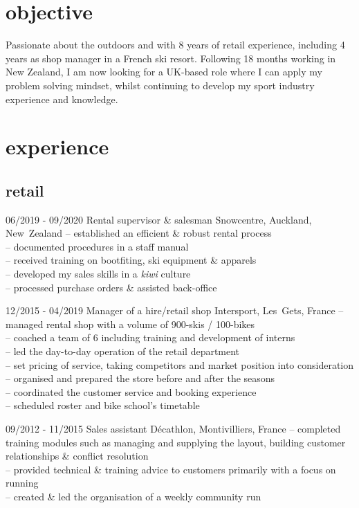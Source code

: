 \documentclass[a4paper]{farangoth-cv}
\begin{document}
\vspace{2.2\parskip}
\section{objective}
Passionate about the outdoors and with 8 years of retail experience, including 4 years as shop manager in a French ski resort. Following 18 months working in New Zealand, I am now looking for a UK-based role where I can apply my problem solving mindset, whilst continuing to develop my sport industry experience and knowledge.

\section{experience}
\subsection{retail}
\begin{entrylist}
  \entry%
  {06/2019 \-- 09/2020}
  {Rental supervisor \& salesman}
  {Snowcentre, \mbox{Auckland}, \mbox{New Zealand}}
  {
    \--- established an efficient \& robust rental process\\
    \--- documented  procedures in a staff manual\\
    \--- received training on bootfiting, ski equipment \& apparels\\
    \--- developed my sales skills in a \emph{kiwi} culture\\
    \--- processed purchase orders \& assisted back-office
  }

  \entry%
  {12/2015 \-- 04/2019}
  {Manager of a hire/retail shop}
  {Intersport, \mbox{Les Gets}, \mbox{France}}
  {
    \--- managed rental shop with a volume of 900-skis / 100-bikes\\
    \--- coached a team of 6 including training and development of interns\\
    \--- led the day-to-day operation of the retail department\\
    \--- set pricing of service, taking competitors and market position into consideration\\
    \--- organised and prepared the store before and after the seasons\\
    \--- coordinated the customer service and booking experience\\
    \--- scheduled roster and bike school's timetable
  }

  \entry%
  {09/2012 \-- 11/2015}
  {Sales assistant}
  {Décathlon, \mbox{Montivilliers}, \mbox{France}}
  {%
    \--- completed training modules such as managing and supplying the layout, building customer relationships \& conflict resolution\\
    \--- provided technical \& training advice to customers primarily with a focus on running\\
    \--- created \& led the organisation of a weekly community run
  }
\end{entrylist}
\end{document}

